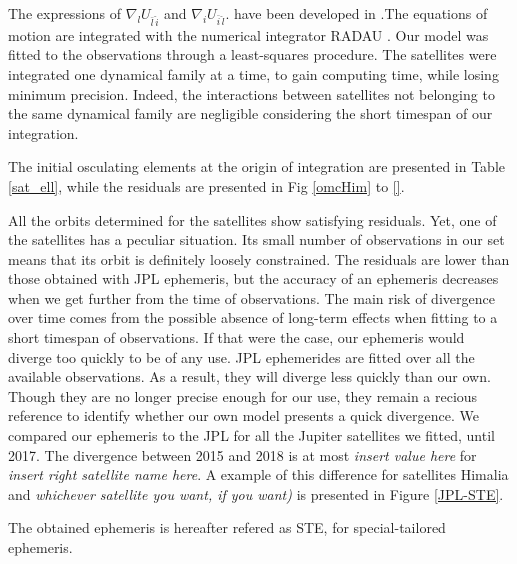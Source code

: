 \documentclass[traditabstract]{aa}
\begin{document}
The expressions of $\nabla_lU_{\bar{l}\, \hat{i}}$ and $\nabla_i U_{\bar{i}\, \hat{l}}.$ have been developed in \citet{Lainey2004}.The equations of motion are integrated with the numerical integrator RADAU \citep{Everhart1985}. 
Our model was fitted to the observations through a least-squares procedure. The satellites were integrated one dynamical family at a time, to gain computing time, while losing minimum precision. Indeed, the interactions between satellites not belonging to the same dynamical family are negligible considering the short timespan of our integration. 

The initial osculating elements at the origin of integration are presented in Table \ref{sat_ell}, while the residuals are presented in Fig \ref{omcHim} to \ref{}. %

All the orbits determined for the satellites show satisfying residuals. Yet, one of the satellites has a peculiar situation. Its small number of observations in our set means that its orbit is definitely loosely constrained. 
The residuals are lower than those obtained with JPL ephemeris, but the accuracy of an ephemeris decreases when we get further from the time of observations. The main risk of divergence over time comes from the possible absence of long-term effects when fitting to a short timespan of observations. If that were the case, our ephemeris would diverge too quickly to be of any use. JPL ephemerides are fitted over all the available observations. As a result, they will diverge less quickly than our own. Though they are no longer precise enough for our use, they remain a recious reference to identify whether our own model presents a quick divergence. We compared our ephemeris to the JPL for all the Jupiter satellites we fitted, until 2017. The divergence between 2015 and 2018 is at most \textit{\color{red}insert value here} for \textit{\color{red}insert right satellite name here}. A example of this difference for satellites Himalia and \textit{\color{red}whichever satellite you want, if you want)} is presented in Figure \ref{JPL-STE}.

The obtained ephemeris is hereafter refered as STE, for special-tailored ephemeris. 
\end{document}
